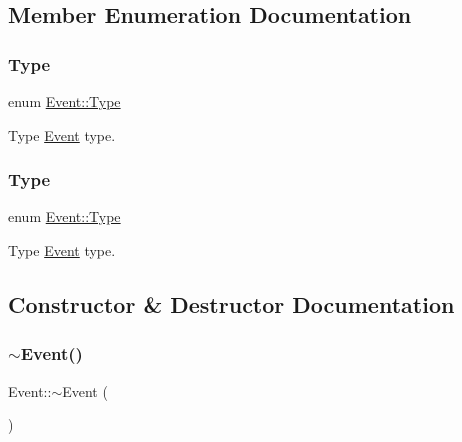 \subsection{Member Enumeration Documentation}
\mbox{\label{classEvent_a2abf13b5be49315e9e362af02029f058}} 
\subsubsection{\texorpdfstring{Type}{Type}\hspace{0.1cm}{\footnotesize\ttfamily [1/2]}}
{\footnotesize\ttfamily enum \hyperlink{classEvent_a2abf13b5be49315e9e362af02029f058}{Event\+::\+Type}\hspace{0.3cm}{\ttfamily [strong]}}

Type \hyperlink{classEvent}{Event} type. \mbox{\label{classEvent_a2abf13b5be49315e9e362af02029f058}} 
\subsubsection{\texorpdfstring{Type}{Type}\hspace{0.1cm}{\footnotesize\ttfamily [2/2]}}
{\footnotesize\ttfamily enum \hyperlink{classEvent_a2abf13b5be49315e9e362af02029f058}{Event\+::\+Type}\hspace{0.3cm}{\ttfamily [strong]}}

Type \hyperlink{classEvent}{Event} type. 

\subsection{Constructor \& Destructor Documentation}
\mbox{\label{classEvent_a7704ec01ce91e673885792054214b3d2}} 
\subsubsection{\texorpdfstring{$\sim$\+Event()}{~Event()}\hspace{0.1cm}{\footnotesize\ttfamily [1/2]}}
{\footnotesize\ttfamily Event\+::$\sim$\+Event (\begin{DoxyParamCaption}{ }\end{DoxyParamCaption})\hspace{0.3cm}{\ttfamily [virtual]}}

